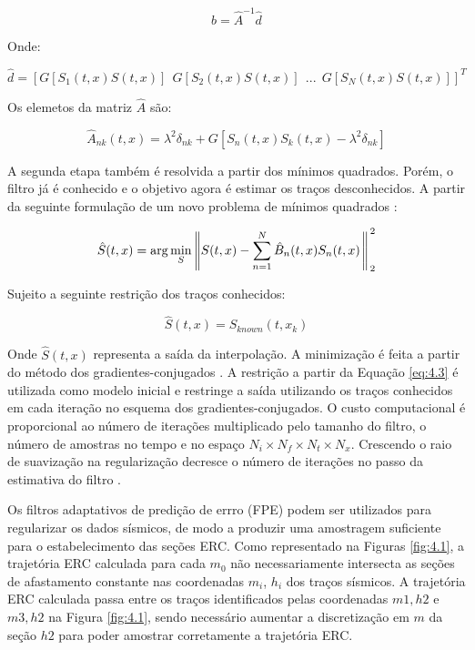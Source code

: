 \begin{equation}
\label{eq:4.6}
 b = \hat{A}^{-1}\hat{d}
\end{equation}

Onde:

\begin{equation}
\label{eq:4.7}
 \hat{d} = [ G[S_1(t,x)S(t,x)]\:\: G[S_2(t,x)S(t,x)]\:\: ...\:\: G[S_N(t,x)S(t,x)] ]^T
\end{equation}

Os elemetos da matriz $\hat{A}$ são:

\begin{equation}
\label{eq:4.8}
 \hat{A}_{nk}(t,x) = \lambda^2 \delta_{nk} + G[S_n(t,x)S_k(t,x) - \lambda^2 \delta_{nk}]
\end{equation}

A segunda etapa também é resolvida a partir dos mínimos quadrados. Porém,
o filtro já é conhecido e o objetivo agora é estimar os traços desconhecidos.
A partir da seguinte formulação de um novo problema de mínimos quadrados \cite{liu11}:

\begin{equation}
\label{eq:4.9}
 \hat{S}(t,x) = \arg \min_S \left \rVert S(t,x) - \sum^N_{n=1}\hat{B}_n(t,x) S_n(t,x) \right \Arrowvert^2_2
\end{equation}

Sujeito a seguinte restrição dos traços conhecidos:

\begin{equation}
\label{eq:4.10}
 \hat{S}(t,x) = S_{known}(t,x_k)
\end{equation}

Onde $\hat{S}(t,x)$ representa a saída da interpolação.
A minimização é feita a partir do método dos gradientes-conjugados \cite{hestenes}. 
A restrição a partir da Equação \ref{eq:4.3} é utilizada como modelo inicial e restringe
a saída utilizando os traços conhecidos em cada iteração no esquema dos gradientes-conjugados.
O custo computacional é proporcional ao número de iterações multiplicado
pelo tamanho do filtro, o número de amostras no tempo e no espaço $N_i \times N_f \times N_t \times N_x$. 
Crescendo o raio de suavização na regularização decresce o número de iterações no passo da
estimativa do filtro \cite{liu11}.

Os filtros adaptativos de predição de errro (FPE) podem ser utilizados para regularizar os dados sísmicos,
de modo a produzir uma amostragem suficiente para o estabelecimento das seções ERC.
Como representado na Figuras \ref{fig:4.1}, a trajetória ERC calculada para cada $m_0$ não
necessariamente intersecta as seções de afastamento constante nas coordenadas $m_i$, $h_i$ dos traços sísmicos. 
A trajetória ERC calculada passa entre os traços identificados pelas coordenadas $m1,h2$ e $m3, h2$ na Figura \ref{fig:4.1},
sendo necessário aumentar a discretização em $m$ da seção $h2$ para poder amostrar corretamente a trajetória ERC.

